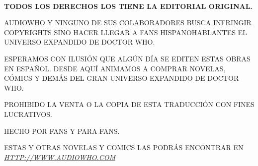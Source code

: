 \clearpage
~
\vfill
\begin{center}

\textbf{TODOS LOS DERECHOS LOS TIENE LA EDITORIAL ORIGINAL.}

\vspace{2mm}

AUDIOWHO Y NINGUNO DE SUS COLABORADORES BUSCA INFRINGIR COPYRIGHTS SINO HACER LLEGAR A FANS HISPANOHABLANTES EL UNIVERSO EXPANDIDO DE DOCTOR WHO.

\vspace{2mm}

ESPERAMOS CON ILUSIÓN QUE ALGÚN DÍA SE EDITEN ESTAS OBRAS EN ESPAÑOL. DESDE AQUÍ ANIMAMOS A COMPRAR NOVELAS, CÓMICS Y DEMÁS DEL GRAN UNIVERSO EXPANDIDO DE DOCTOR WHO.

\vspace{2mm}

PROHIBIDO LA VENTA O LA COPIA DE ESTA TRADUCCIÓN CON FINES LUCRATIVOS.

\vspace{2mm}

HECHO POR FANS Y PARA FANS.

\vspace{2mm}

ESTAS Y OTRAS NOVELAS Y COMICS LAS PODRÁS ENCONTRAR EN  \href{http://www.audiowho.com}{\textit{HTTP://WWW.AUDIOWHO.COM}}
\end{center}